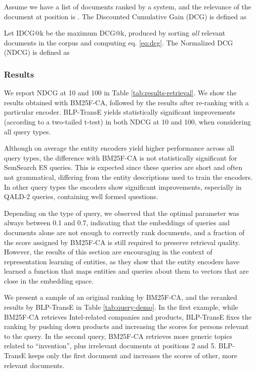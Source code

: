 \documentclass[sigconf]{acmart}
\begin{document}
Assume we have a list of  documents ranked by a system, and the relevance of the document at position  is . The Discounted Cumulative Gain (DCG) is defined as

Let IDCG@k be the maximum DCG@k, produced by sorting \textit{all} relevant documents in the corpus and computing eq. \ref{eq:dcg}. The Normalized DCG (NDCG) is defined as


\subsubsection{Results} We report NDCG at 10 and 100 in Table \ref{tab:results-retrieval}. We show the results obtained with BM25F-CA, followed by the results after re-ranking with a particular encoder. BLP-TransE yields statistically significant improvements (according to a two-tailed t-test) in both NDCG at 10 and 100, when considering all query types.

Although on average the entity encoders yield higher performance across all query types, the difference with BM25F-CA is not statistically significant for SemSearch ES queries. This is expected since these queries are short and often not grammatical, differing from the entity descriptions used to train the encoders. In other query types the encoders show significant improvements, especially in QALD-2 queries, containing well formed questions.

Depending on the type of query, we observed that the optimal parameter  was always between 0.1 and 0.7, indicating that the embeddings of queries and documents alone are not enough to correctly rank documents, and a fraction of the score assigned by BM25F-CA is still required to preserve retrieval quality. However, the results of this section are encouraging in the context of representation learning of entities, as they show that the entity encoders have learned a function that maps entities and queries about them to vectors that are close in the embedding space.

We present a sample of an original ranking by BM25F-CA, and the reranked results by BLP-TransE in Table \ref{tab:query-demo}. In the first example, while BM25F-CA retrieves Intel-related companies and products, BLP-TransE fixes the ranking by pushing down products and increasing the scores for persons relevant to the query. In the second query, BM25F-CA retrieves more generic topics related to ``invention'', plus irrelevant documents at positions 2 and 5. BLP-TransE keeps only the first document and increases the scores of other, more relevant documents. 
\end{document}
